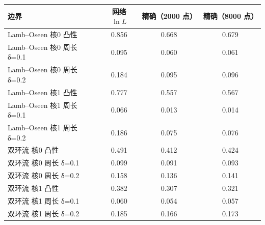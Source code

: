 \begin{tabular}{lccc}\toprule 边界 & 网络 $\ln L$ & 精确（2000 点） & 精确（8000 点）\\\midrule
Lamb–Oseen 核0 凸性 & 0.856 & 0.668 & 0.679\\
Lamb–Oseen 核0 周长 δ=0.1 & 0.095 & 0.060 & 0.061\\
Lamb–Oseen 核0 周长 δ=0.2 & 0.184 & 0.095 & 0.096\\
Lamb–Oseen 核1 凸性 & 0.777 & 0.557 & 0.567\\
Lamb–Oseen 核1 周长 δ=0.1 & 0.066 & 0.013 & 0.014\\
Lamb–Oseen 核1 周长 δ=0.2 & 0.186 & 0.075 & 0.076\\
双环流 核0 凸性 & 0.491 & 0.412 & 0.424\\
双环流 核0 周长 δ=0.1 & 0.099 & 0.091 & 0.093\\
双环流 核0 周长 δ=0.2 & 0.158 & 0.136 & 0.141\\
双环流 核1 凸性 & 0.382 & 0.307 & 0.321\\
双环流 核1 周长 δ=0.1 & 0.060 & 0.054 & 0.057\\
双环流 核1 周长 δ=0.2 & 0.185 & 0.166 & 0.173\\
\bottomrule\end{tabular}